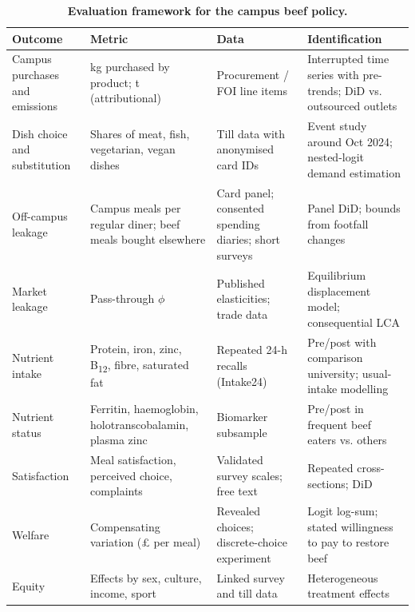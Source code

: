 \begin{table}[H]\centering\scriptsize
\caption{\textbf{Evaluation framework for the campus beef policy.}}\label{tab:evaluation}
\begin{tabular}{>{\raggedright\arraybackslash}p{2.6cm}>{\raggedright\arraybackslash}p{3.6cm}>{\raggedright\arraybackslash}p{3.4cm}>{\raggedright\arraybackslash}p{4.6cm}}
\toprule
Outcome & Metric & Data & Identification \\
\midrule
Campus purchases and emissions & kg purchased by product; t \COtwoe{} (attributional) & Procurement / FOI line items & Interrupted time series with pre-trends; DiD vs. outsourced outlets \\
Dish choice and substitution & Shares of meat, fish, vegetarian, vegan dishes & Till data with anonymised card IDs & Event study around Oct 2024; nested-logit demand estimation \\
Off-campus leakage & Campus meals per regular diner; beef meals bought elsewhere & Card panel; consented spending diaries; short surveys & Panel DiD; bounds from footfall changes \\
Market leakage & Pass-through $\phi$ & Published elasticities; trade data & Equilibrium displacement model; consequential LCA \\
Nutrient intake & Protein, iron, zinc, B\textsubscript{12}, fibre, saturated fat & Repeated 24-h recalls (Intake24) & Pre/post with comparison university; usual-intake modelling \\
Nutrient status & Ferritin, haemoglobin, holotranscobalamin, plasma zinc & Biomarker subsample & Pre/post in frequent beef eaters vs. others \\
Satisfaction & Meal satisfaction, perceived choice, complaints & Validated survey scales; free text & Repeated cross-sections; DiD \\
Welfare & Compensating variation (£ per meal) & Revealed choices; discrete-choice experiment & Logit log-sum; stated willingness to pay to restore beef \\
Equity & Effects by sex, culture, income, sport & Linked survey and till data & Heterogeneous treatment effects \\
\bottomrule
\end{tabular}
\end{table}
